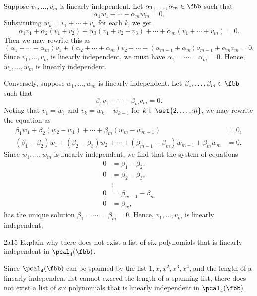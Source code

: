 \begin{sol}
    Suppose $v_1, \ldots, v_m$ is linearly independent.
	Let $\alpha_1, \ldots, \alpha_m \in \fbb$ such that
    \[
    	\alpha_1 w_1 + \cdots + \alpha_m w_m = 0.
    \]
    Substituting $w_k = v_1 + \cdots + v_k$ for each $k$, we get
    \[
    	\alpha_1 v_1 + \alpha_2(v_1 + v_2) + \alpha_3(v_1 + v_2 + v_3) + \cdots + \alpha_m(v_1 + \cdots + v_m) = 0.
    \]
    Then we may rewrite this as
    \[
    	(\alpha_1 + \cdots + \alpha_m) v_1 + (\alpha_2 + \cdots + \alpha_m) v_2 + \cdots + (\alpha_{m-1} + \alpha_m) v_{m-1} + \alpha_m v_m = 0.
    \]
    Since $v_1, \ldots, v_m$ is linearly independent, we must have $\alpha_1 = \cdots = \alpha_m = 0$.
	Hence, $w_1, \ldots, w_m$ is linearly independent.

    Conversely, suppose $w_1, \ldots, w_m$ is linearly independent.
	Let $\beta_1, \ldots, \beta_m \in \fbb$ such that
    \[
    	\beta_1 v_1 + \cdots + \beta_m v_m = 0.
    \]
    Noting that $v_1 = w_1$ and $v_k = w_k - w_{k-1}$ for $k \in \set{2, \ldots, m}$, we may rewrite the equation as
    \begin{align*}
        \beta_1 w_1 + \beta_2 (w_2 - w_1) + \cdots + \beta_m (w_m - w_{m-1}) &= 0, \\
        (\beta_1 - \beta_2) w_1 + (\beta_2 - \beta_3) w_2 + \cdots + (\beta_{m-1} - \beta_m) w_{m-1} + \beta_m w_m &= 0.
    \end{align*}
    Since $w_1, \ldots, w_m$ is linearly independent, we find that the system of equations
    \begin{align*}
        0 & = \beta_1 - \beta_2, \\
        0 & = \beta_2 - \beta_3, \\
        & \vdots \\
        0 & = \beta_{m - 1} - \beta_m \\
        0 & = \beta_m,
    \end{align*}
    has the unique solution $\beta_1 = \cdots = \beta_m = 0$.
	Hence, $v_1, \ldots, v_m$ is linearly independent.
\end{sol}
 
\begin{exercise}{2a15}
    Explain why there does not exist a list of six polynomials that is linearly independent in $\pcal_4(\fbb)$.
\end{exercise}

\begin{sol}
    Since $\pcal_4(\fbb)$ can be spanned by the list $1, x, x^2, x^3, x^4$, and the length of a linearly independent list cannot exceed the length of a spanning list, there does not exist a list of six polynomials that is linearly independent in $\pcal_4(\fbb)$.
\end{sol}
 
